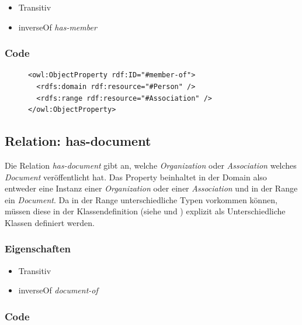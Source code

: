 \documentclass[
    11pt,
    latin1,
    a4paper,
    oneside
]{scrreprt}
\begin{document}
\begin{itemize}
  \item Transitiv
  \item inverseOf \emph{has-member}
\end{itemize}

\subsubsection{Code} \label{sec:rel_memberof_code}

\begin{figure}[H]
 \lstset{language=XML}
 \begin{lstlisting}[label=owl:memberof,caption={Die Relation \emph{member-of} gibt alle \emph{Association} an, bei welcher die Person Mitglied ist}]
<owl:ObjectProperty rdf:ID="#member-of">
  <rdfs:domain rdf:resource="#Person" />
  <rdfs:range rdf:resource="#Association" />
</owl:ObjectProperty>
 \end{lstlisting}
\end{figure}


\subsection{Relation: has-document} \label{sec:rel_hasdocument}

Die Relation \emph{has-document} gibt an, welche \emph{Organization} oder \emph{Association} welches \emph{Document} ver\"offentlicht hat. Das Property beinhaltet in der Domain also entweder eine Instanz einer \emph{Organization} oder einer \emph{Association} und in der Range ein \emph{Document}. Da in der Range unterschiedliche Typen vorkommen k\"onnen, m\"ussen diese in der Klassendefinition (siehe  und ) explizit als Unterschiedliche Klassen definiert werden.

\subsubsection{Eigenschaften} \label{sec:rel_hasdocument_settings}

\begin{itemize}
  \item Transitiv
  \item inverseOf \emph{document-of}
\end{itemize}

\subsubsection{Code} \label{sec:rel_hasdocument_code}
\end{document}
